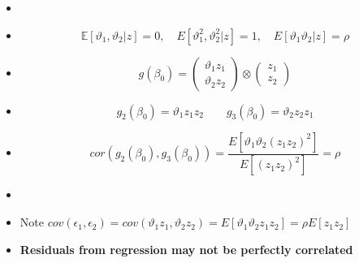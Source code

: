 \documentclass{beamer}
\begin{document}
\begin{frame}
\begin{itemize}

\item[] \begin{center} \end{center}
\item[]  \begin{equation*}\mathbb{E}[\vartheta_1,\vartheta_2|z]=0, \quad E[\vartheta_1^2,\vartheta_2^2|z]=1, \quad   E[\vartheta_1\vartheta_2|z]=\rho\end{equation*}

    \item[]\begin{equation} g(\beta_0)=\left(\begin{array}{c} \vartheta_{1}z_1 \\  \vartheta_{2}z_2 \end{array}\right) \otimes \left(\begin{array}{c} z_1 \\ z_2 \end{array} \right) \end{equation}
    \item[] \begin{equation*} g_2(\beta_0)=\vartheta_1 z_1 z_2 \qquad g_3(\beta_0)=\vartheta_2 z_2z_1\end{equation*}
    \item[] \begin{equation*} cor(g_2(\beta_0),g_3(\beta_0))= \frac{E[\vartheta_1\vartheta_2 (z_1 z_2)^2]}{E[(z_1 z_2)^2]}=\rho\end{equation*}

    \item[] 
    \vspace{5pt}
    \item[] Note $cov(\epsilon_1,\epsilon_2)=cov(\vartheta_1 z_1,\vartheta_2z_2)=E[\vartheta_1 \vartheta_2z_1z_2]=\rho E[z_1 z_2]$
     \vspace{5pt}

    \item[] \textbf{Residuals from regression may not be perfectly correlated}

\end{itemize}
\end{frame}
\end{document}
